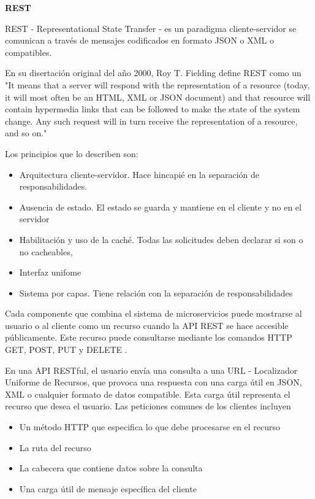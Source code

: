\textbf{REST}

REST - Representational State Transfer - es un paradigma cliente-servidor se comunican a través de mensajes codificados en formato JSON o XML o compatibles.

En su disertación original del año 2000, Roy T. Fielding define REST como un "It means that a server will respond with the representation of a resource (today, it will most often be an HTML, XML or JSON document) and that resource will contain hypermedia links that can be followed to make the state of the system change. Any such request will in turn receive the representation of a resource, and so on." \cite{FieldingRoyThomas2000Asat}

Los principios que lo describen son:

\begin{itemize}
    \item Arquitectura cliente-servidor. Hace hincapié en la separación de responsabilidades.
    \item Ausencia de estado. El estado se guarda y mantiene en el cliente y no en el servidor
    \item Habilitación y uso de la caché. Todas las solicitudes deben declarar si son o no cacheables,
    \item Interfaz unifome
    \item Sistema por capas. Tiene relación con la separación de responsabilidades
\end{itemize}


Cada componente que combina el sistema de microservicios puede mostrarse al usuario o al cliente como un recurso cuando la API REST se hace accesible públicamente. Este recurso puede consultarse mediante los comandos HTTP GET, POST, PUT y DELETE .

En una API RESTful, el usuario envía una consulta a una URL - Localizador Uniforme de Recursos, que provoca una respuesta con una carga útil en JSON, XML o cualquier formato de datos compatible. Esta carga útil representa el recurso que desea el usuario. Las peticiones comunes de los clientes incluyen

\begin{itemize}
    \item Un método HTTP que especifica lo que debe procesarse en el recurso
    \item La ruta del recurso
    \item La cabecera que contiene datos sobre la consulta
    \item Una carga útil de mensaje específica del cliente
\end{itemize}


